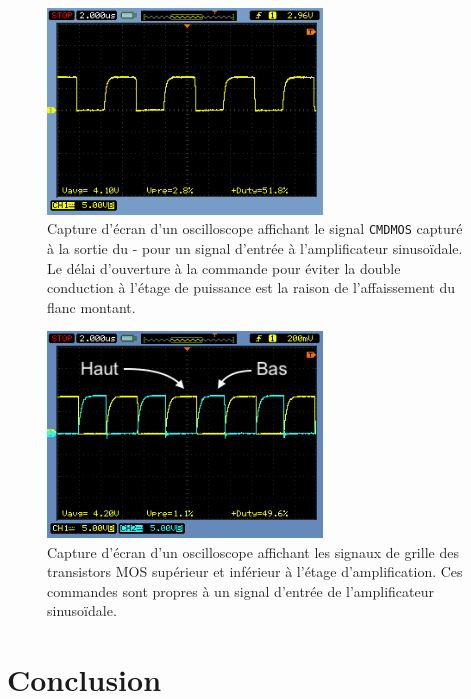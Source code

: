 \documentclass[10pt, oneside, a4paper]{article}
\begin{document}
\begin{figure}[htbp]
	\centering
	\includegraphics[width=0.65\textwidth]{image/osci-cmdmos.png}
	\caption{Capture d'écran d'un oscilloscope affichant le signal \texttt{CMDMOS}
			 capturé à la sortie du \Sigma{}-\Delta{} pour un signal d'entrée à
			 l'amplificateur sinusoïdale.
			 Le délai d'ouverture à la commande pour éviter la double conduction à
			 l'étage de puissance est la raison de l'affaissement du flanc montant.}
	\label{fig:osci-cmdmos}
\end{figure}

\begin{figure}[htbp]
	\centering
	\includegraphics[width=0.65\textwidth]{image/osci-high-low.png}
	\caption{Capture d'écran d'un oscilloscope affichant les signaux de grille des
			 transistors MOS supérieur et inférieur à l'étage d'amplification.
			 Ces commandes sont propres à un signal d'entrée de l'amplificateur
			 sinusoïdale.}
	\label{fig:osci-high-low}
\end{figure}

\section{Conclusion}


\end{document}
